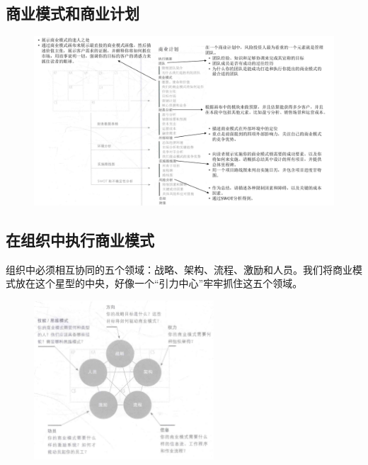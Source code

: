 \subsection{商业模式和商业计划}
\begin{figure}[H]
	\centering
	\vspace{-0.5em}
	\includegraphics[width=\textwidth]{img/商业模式和商业计划.pdf}
	\vspace{-0.5em}
\end{figure}

\subsection{在组织中执行商业模式}
组织中必须相互协同的五个领域：战略、架构、流程、激励和人员。我们将商业模式放在这个星型的中央，好像一个“引力中心”牢牢抓住这五个领域。
\begin{figure}[H]
	\centering
	\vspace{-0.5em}
	\includegraphics[width=0.6\textwidth]{img/在组织中执行商业模式.png}
	\vspace{-0.5em}
\end{figure}


